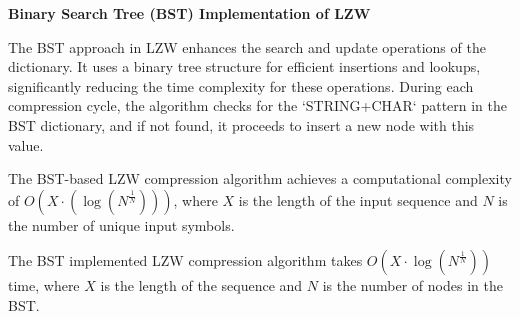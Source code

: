 \documentclass[12pt, a4paper]{article}
\begin{document}
\textbf{Binary Search Tree (BST) Implementation of LZW}

The BST approach in LZW enhances the search and update operations of the dictionary. It uses a binary tree structure for efficient insertions and lookups, significantly reducing the time complexity for these operations. During each compression cycle, the algorithm checks for the `STRING+CHAR` pattern in the BST dictionary, and if not found, it proceeds to insert a new node with this value.

\begin{theorem}
The BST-based LZW compression algorithm achieves a computational complexity of \( O(X \cdot (\log (N^\frac{1}{N}))) \), where \( X \) is the length of the input sequence and \( N \) is the number of unique input symbols.
\end{theorem}

\begin{theorem}
The BST implemented LZW compression algorithm takes \( O(X \cdot \log (N^{\frac{1}{N}})) \) time, where \( X \) is the length of the sequence and \( N \) is the number of nodes in the BST.
\end{theorem}
\end{document}
